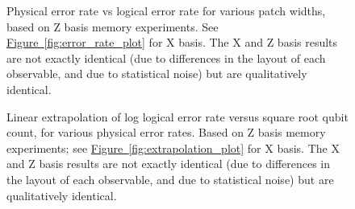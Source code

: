 \documentclass[onecolumn,unpublished,a4paper]{quantumarticle}
\theoremstyle{definition}
\theoremstyle{definition}
\theoremstyle{definition}
\newcommand{\fig}[1]{\hyperref[fig:#1]{Figure~\ref*{fig:#1}}}
\begin{document}
\begin{figure}[h!]
    \centering
    \caption{
        Physical error rate vs logical error rate for various patch widths, based on Z basis memory experiments.
        See \fig{error_rate_plot} for X basis.
        The X and Z basis results are not exactly identical (due to differences in the layout of each observable, and due to statistical noise) but are qualitatively identical.
    }
    \label{fig:error_rate_plot_z}
\end{figure}

\begin{figure}[h!]
    \centering
    \caption{
        Linear extrapolation of log logical error rate versus square root qubit count, for various physical error rates.
        Based on Z basis memory experiments; see \fig{extrapolation_plot} for X basis.
        The X and Z basis results are not exactly identical (due to differences in the layout of each observable, and due to statistical noise) but are qualitatively identical.
    }
    \label{fig:extrapolation_plot_other_z}
\end{figure}
\end{document}
